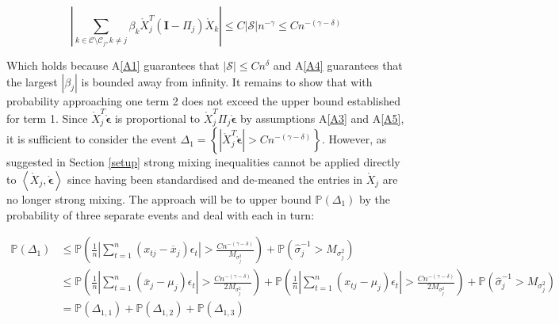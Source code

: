 \documentclass[11pt]{report}\usepackage[utf8]{inputenc}
\begin{document}
\begin{equation*}
    \left | \sum_{k \in \mathcal{C} \setminus  \mathcal{C}_j, k \neq j } \beta_k \mathring{X}_j^T (\mathbf{I} - \Pi_j) \mathring{X}_k \right | \leq  C\left | \mathcal{S} \right |n^{-\gamma} \leq Cn^{-(\gamma-\delta)}
\end{equation*}

Which holds because A\ref{A1} guarantees that $\left | \mathcal{S} \right | \leq Cn^{\delta}$ and A\ref{A4} guarantees that the largest $|\beta_j|$ is bounded away from infinity. It remains to show that with probability approaching one term 2 does not exceed the upper bound established for term 1. Since $\mathring{X}_j^T \mathring{\boldsymbol{\epsilon}}$ is proportional to $\mathring{X}_j^T \Pi_j\mathring{\boldsymbol{\epsilon}}$ by assumptions A\ref{A3} and A\ref{A5}, it is sufficient to consider the event $\Delta_1 = \left \{ \left | \mathring{X}_j^T \mathring{\boldsymbol{\epsilon}} \right | > Cn^{-\left ( \gamma-\delta \right )}  \right \}$. However, as suggested in Section \ref{setup} strong mixing inequalities cannot be applied directly to $\left \langle \mathring{X}_j, \mathring{\boldsymbol{\epsilon}} \right \rangle$ since having been standardised and de-meaned the entries in $\mathring{X}_j$ are no longer strong mixing. The approach will be to upper bound $\mathbb{P}\left ( \Delta_1 \right )$ by the probability of three separate events and deal with each in turn: 

\begin{align*}
    \mathbb{P}\left ( \Delta_1 \right ) & \leq  \mathbb{P}\left ( \frac{1}{n} \left |  \sum_{t=1}^{n} \left ( x_{tj} - \overline{x}_j \right ) \epsilon_t \right | > \frac{Cn^{-\left ( \gamma-\delta \right )}}{M_{\sigma^2_j}} \right ) + \mathbb{P}\left ( \widehat{\sigma}_j^{-1} > M_{\sigma^2_j} \right ) \\
    & \leq \mathbb{P}\left ( \frac{1}{n} \left |  \sum_{t=1}^{n} \left ( \overline{x}_j - \mu_j \right ) \epsilon_t \right | > \frac{Cn^{-\left ( \gamma-\delta \right )}}{2M_{\sigma^2_j}} \right ) + \mathbb{P}\left ( \frac{1}{n} \left |  \sum_{t=1}^{n} \left ( x_{tj} - \mu_j \right ) \epsilon_t \right | > \frac{Cn^{-\left ( \gamma-\delta \right )}}{2M_{\sigma^2_j}}\right ) + \mathbb{P}\left ( \widehat{\sigma}_j^{-1} > M_{\sigma^2_j} \right ) \\ 
    & = \mathbb{P}\left ( \Delta_{1,1} \right ) + \mathbb{P}\left ( \Delta_{1,2} \right ) + \mathbb{P}\left ( \Delta_{1,3} \right )
\end{align*}
\end{document}

